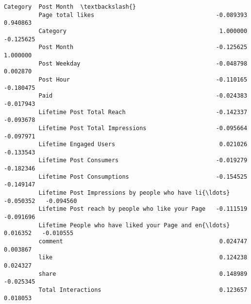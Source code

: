 \documentclass[11pt]{article}
\begin{document}
\begin{Verbatim}[commandchars=\\\{\}]
                                                              Category  Post Month  \textbackslash{}
          Page total likes                                   -0.089393    0.940863   
          Category                                            1.000000   -0.125625   
          Post Month                                         -0.125625    1.000000   
          Post Weekday                                       -0.048798    0.002870   
          Post Hour                                          -0.110165   -0.180475   
          Paid                                               -0.024383   -0.017943   
          Lifetime Post Total Reach                          -0.142337   -0.093678   
          Lifetime Post Total Impressions                    -0.095664   -0.097971   
          Lifetime Engaged Users                              0.021026   -0.133543   
          Lifetime Post Consumers                            -0.019279   -0.182346   
          Lifetime Post Consumptions                         -0.154525   -0.149147   
          Lifetime Post Impressions by people who have li{\ldots} -0.050352   -0.094560   
          Lifetime Post reach by people who like your Page   -0.111519   -0.091696   
          Lifetime People who have liked your Page and en{\ldots}  0.016352   -0.010555   
          comment                                             0.024747    0.003867   
          like                                                0.124238    0.024327   
          share                                               0.148989   -0.025345   
          Total Interactions                                  0.123657    0.018053   
          

\end{Verbatim}
\end{document}
